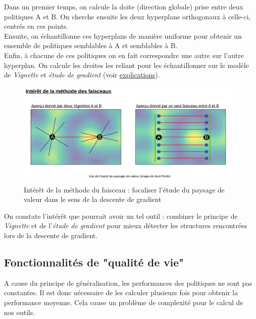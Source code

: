 \documentclass[12pt]{article}
\begin{document}
Dans un premier temps, on calcule la doite (direction globale) prise entre deux politiques A et B. On cherche ensuite les deux hyperplans orthogonaux à celle-ci, centrés en ces points. \\

Ensuite, on échantillonne ces hyperplans de manière uniforme pour obtenir un ensemble de politiques semblables à A et semblables à B. \\

Enfin, à chacune de ces politiques on en fait correspondre une autre sur l'autre hyperplan. On calcule les droites les reliant pour les échantillonner sur le modèle de \emph{Vignette} et \emph{étude de gradient} (voir \hyperref[fig:ligne1]{explications}). \\

\begin{figure}[htp]
    \centering
    \includegraphics[width=18cm]{Images/faisceaux_interet}
    \caption{Intérêt de la méthode du faisceau : focaliser l'étude du paysage de valeur dans le sens de la descente de gradient}
    \label{fig:faisceauxInteret}
\end{figure}

On constate l'intérêt que pourrait avoir un tel outil : combiner le principe de \emph{Vignette} et de l'\emph{étude de gradient} pour mieux détecter les structures rencontrées lors de la descente de gradient. \\

\subsection{Fonctionnalités de "qualité de vie"}

A cause du principe de généralisation, les performances des politiques ne sont pas constantes. Il est donc nécessaire de les calculer plusieurs fois pour obtenir la performance moyenne. Cela cause un problème de complexité pour le calcul de nos outils. \\
\end{document}
